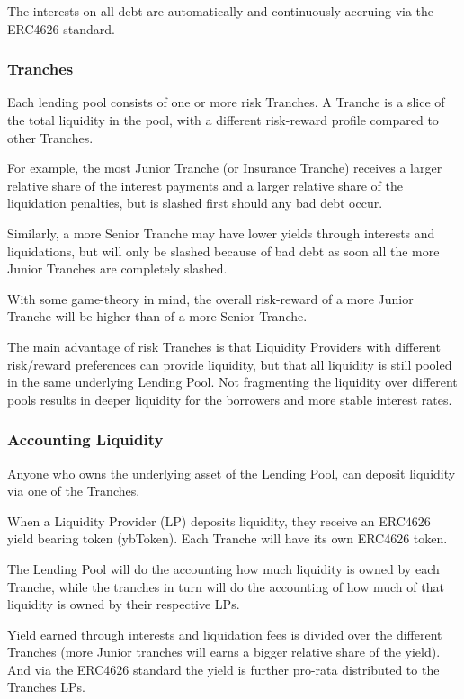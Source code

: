 \documentclass[sigconf,nonacm]{acmart}
\begin{document}
The interests on all debt are automatically and continuously accruing via the ERC4626 standard.

\subsubsection{Tranches}
Each lending pool consists of one or more risk Tranches.
A Tranche is a slice of the total liquidity in the pool, with a different risk-reward profile compared to other Tranches.

For example, the most Junior Tranche (or Insurance Tranche) receives a larger relative share of the interest payments and a larger relative share of the liquidation penalties,
but is slashed first should any bad debt occur.

Similarly, a more Senior Tranche may have lower yields through interests and liquidations,
but will only be slashed because of bad debt as soon all the more Junior Tranches are completely slashed.

With some game-theory in mind, the overall risk-reward of a more Junior Tranche will be higher than of a more Senior Tranche.

The main advantage of risk Tranches is that Liquidity Providers with different risk/reward preferences can provide liquidity,
but that all liquidity is still pooled in the same underlying Lending Pool.
Not fragmenting the liquidity over different pools results in deeper liquidity for the borrowers and more stable interest rates.

\subsubsection{Accounting Liquidity}
\label{subsubsec:accounting-liquidity}
Anyone who owns the underlying asset of the Lending Pool, can deposit liquidity via one of the Tranches.

When a Liquidity Provider (LP) deposits liquidity, they receive an ERC4626 yield bearing token (ybToken).
Each Tranche will have its own ERC4626 token.

The Lending Pool will do the accounting how much liquidity is owned by each Tranche,
while the tranches in turn will do the accounting of how much of that liquidity is owned by their respective LPs.

Yield earned through interests and liquidation fees is divided over the different Tranches
(more Junior tranches will earns a bigger relative share of the yield).
And via the ERC4626 standard the yield is further pro-rata distributed to the Tranches LPs.
\end{document}
